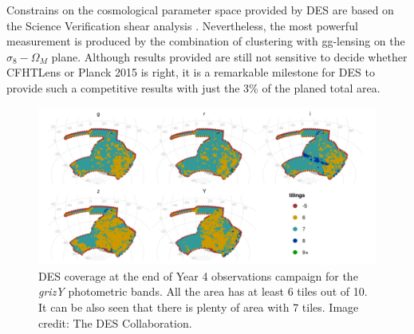 Constrains on the cosmological parameter space  provided by DES are based on the Science Verification shear analysis \cite{2016PhRvD..94b2001A,2016MNRAS.463.3653K}. Nevertheless, the most powerful measurement is produced by the combination of clustering with gg-lensing \cite{2017MNRAS.464.4045K} on the $\sigma_8-\Omega_M$ plane. Although results provided are still not sensitive to decide whether CFHTLens or Planck 2015 is right, it is a remarkable milestone for DES to provide such a competitive results with just the 3\% of the planed total area.
\begin{figure}
\begin{center}
\includegraphics[width=\textwidth]{./Pictures/des_tiles.png}
\caption{DES coverage at the end of Year 4 observations campaign for the {\it grizY} photometric bands. All the area has at least 6 tiles out of 10. It can be also seen that there is plenty of area with 7 tiles. Image credit: The DES Collaboration.}
\label{fig:des_coverage}
\end{center}
\end{figure}
